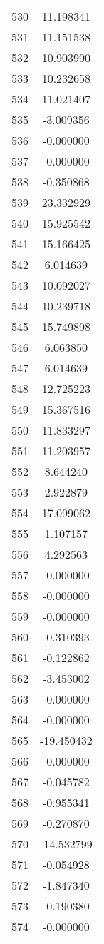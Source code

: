 \documentclass[12pt]{article}
\begin{document}
\begin{longtable}{@{}cc@{}}
530 & 11.198341 \\
531 & 11.151538 \\
532 & 10.903990 \\
533 & 10.232658 \\
534 & 11.021407 \\
535 & -3.009356 \\
536 & -0.000000 \\
537 & -0.000000 \\
538 & -0.350868 \\
539 & 23.332929 \\
540 & 15.925542 \\
541 & 15.166425 \\
542 & 6.014639 \\
543 & 10.092027 \\
544 & 10.239718 \\
545 & 15.749898 \\
546 & 6.063850 \\
547 & 6.014639 \\
548 & 12.725223 \\
549 & 15.367516 \\
550 & 11.833297 \\
551 & 11.203957 \\
552 & 8.644240 \\
553 & 2.922879 \\
554 & 17.099062 \\
555 & 1.107157 \\
556 & 4.292563 \\
557 & -0.000000 \\
558 & -0.000000 \\
559 & -0.000000 \\
560 & -0.310393 \\
561 & -0.122862 \\
562 & -3.453002 \\
563 & -0.000000 \\
564 & -0.000000 \\
565 & -19.450432 \\
566 & -0.000000 \\
567 & -0.045782 \\
568 & -0.955341 \\
569 & -0.270870 \\
570 & -14.532799 \\
571 & -0.054928 \\
572 & -1.847340 \\
573 & -0.190380 \\
574 & -0.000000 \\

\end{longtable}
\end{document}
